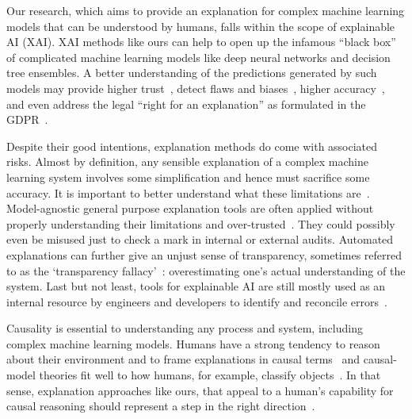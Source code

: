 \documentclass{article}
\begin{document}


Our research, which aims to provide an explanation for complex machine learning models that can be understood by humans, falls within the scope of explainable AI (XAI). XAI methods like ours can help to open up the infamous ``black box'' of complicated machine learning models like deep neural networks and decision tree ensembles. A better understanding of the predictions generated by such models may provide higher trust~\cite{ribeiro2016should}, detect flaws and biases~\cite{kusner2017counterfactual}, higher accuracy~\cite{bhatt2020explainable}, and even address the legal ``right for an explanation'' as formulated in the GDPR~\cite{gdpr2017}.

Despite their good intentions, explanation methods do come with associated risks. Almost by definition, any sensible explanation of a complex machine learning system involves some simplification and hence must sacrifice some accuracy. It is important to better understand what these limitations are~\cite{kumar2020problems}. Model-agnostic general purpose explanation tools are often applied without properly understanding their limitations and over-trusted~\cite{kaur2020interpreting}. They could possibly even be misused just to check a mark in internal or external audits. Automated explanations can further give an unjust sense of transparency, sometimes referred to as the `transparency fallacy'~\cite{edwards2017slave}: overestimating one's actual understanding of the system. Last but not least, tools for explainable AI are still mostly used as an internal resource by engineers and developers to identify and reconcile errors~\cite{bhatt2020explainable}.

Causality is essential to understanding any process and system, including complex machine learning models. Humans have a strong tendency to reason about their environment and to frame explanations in causal terms~\cite{sloman2005causal,lombrozo2017causal} and causal-model theories fit well to how humans, for example, classify objects~\cite{rehder2003causal}. In that sense, explanation approaches like ours, that appeal to a human's capability for causal reasoning should represent a step in the right direction~\cite{mittelstadt2019explaining}.




\end{document}
